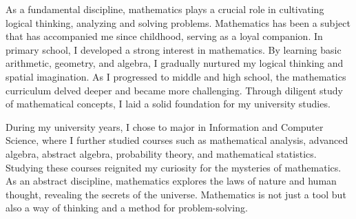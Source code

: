 \begin{tcolorbox}

\hspace{2em}As a fundamental discipline, mathematics plays a crucial role in cultivating logical thinking, analyzing and solving problems. Mathematics has been a subject that has accompanied me since childhood, serving as a loyal companion. In primary school, I developed a strong interest in mathematics. By learning basic arithmetic, geometry, and algebra, I gradually nurtured my logical thinking and spatial imagination. As I progressed to middle and high school, the mathematics curriculum delved deeper and became more challenging. Through diligent study of mathematical concepts, I laid a solid foundation for my university studies.

\hspace{2em}During my university years, I chose to major in Information and Computer Science, where I further studied courses such as mathematical analysis, advanced algebra, abstract algebra, probability theory, and mathematical statistics. Studying these courses reignited my curiosity for the mysteries of mathematics. As an abstract discipline, mathematics explores the laws of nature and human thought, revealing the secrets of the universe. Mathematics is not just a tool but also a way of thinking and a method for problem-solving.


\end{tcolorbox}

